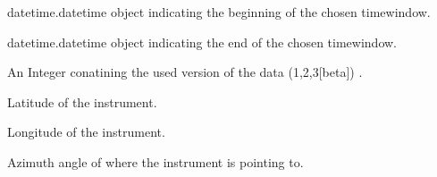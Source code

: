 \documentclass[letterpaper,10pt,english]{sphinxmanual}
\begin{document}
\begin{fulllineitems}

\begin{fulllineitems}
\label{\detokenize{generated/MPPy.Instruments.Radar.Radar:MPPy.Instruments.Radar.Radar.start}}
datetime.datetime object indicating the beginning of the chosen timewindow.

\end{fulllineitems}


\begin{fulllineitems}
\label{\detokenize{generated/MPPy.Instruments.Radar.Radar:MPPy.Instruments.Radar.Radar.end}}
datetime.datetime object indicating the end of the chosen timewindow.

\end{fulllineitems}


\begin{fulllineitems}
\label{\detokenize{generated/MPPy.Instruments.Radar.Radar:MPPy.Instruments.Radar.Radar.data_version}}
An Integer conatining the used version of the data (1,2,3{[}beta{]}) .

\end{fulllineitems}


\begin{fulllineitems}
\label{\detokenize{generated/MPPy.Instruments.Radar.Radar:MPPy.Instruments.Radar.Radar.lat}}
Latitude of the instrument.

\end{fulllineitems}


\begin{fulllineitems}
\label{\detokenize{generated/MPPy.Instruments.Radar.Radar:MPPy.Instruments.Radar.Radar.lon}}
Longitude of the instrument.

\end{fulllineitems}


\begin{fulllineitems}
\label{\detokenize{generated/MPPy.Instruments.Radar.Radar:MPPy.Instruments.Radar.Radar.azimuth}}
Azimuth angle of where the instrument is pointing to.


\end{fulllineitems}
\end{fulllineitems}
\end{document}
